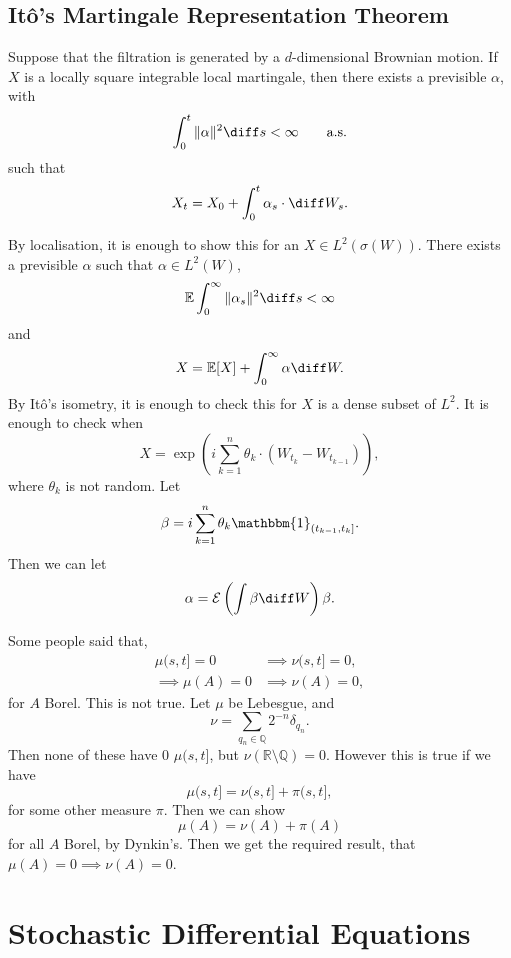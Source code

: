 \documentclass[12pt]{article}
\begin{document}
\subsection{It\^o's Martingale Representation Theorem}%
\label{sub:mrt}

Suppose that the filtration is generated by a $d$-dimensional Brownian motion. If $X$ is a locally square integrable local martingale, then there exists a previsible $\alpha$, with
\[
	\int_0^{t} \|\alpha\|^2 \diff s < \infty \qquad\text{a.s.}
\]
such that
\[
X_t = X_0 + \int_0^{t} \alpha_s \cdot \diff W_s.
\]

\begin{proofbox}
	By localisation, it is enough to show this for an $X \in L^2(\sigma(W))$. There exists a previsible $\alpha$ such that $\alpha \in L^2(W)$,
	\[
	\mathbb{E} \int_0^{\infty} \|\alpha_s\|^2 \diff s< \infty
	\]
	and
	\[
	X = \mathbb{E}[X] + \int_0^{\infty} \alpha \diff W.
	\]
	By It\^o's isometry, it is enough to check this for $X$ is a dense subset of $L^2$. It is enough to check when
	\[
	X = \exp \left( i \sum_{k = 1}^{n} \theta_{k} \cdot (W_{t_k} - W_{t_{k-1}}) \right),
	\]
	where $\theta_k$ is not random. Let
	\[
		\beta = i \sum_{k = 1}^{n} \theta_k \mathbbm{1}_{(t_{k-1}, t_k]}.
	\]
	Then we can let
	\[
	\alpha = \mathcal{E} \left( \int \beta \diff W \right) \beta.
	\]
\end{proofbox}


\begin{exbox}
	Some people said that,
	\begin{align*}
		\mu(s, t] = 0& \implies \nu(s, t] = 0, \\
		\implies \mu(A) = 0 &\implies \nu(A) = 0,
	\end{align*}
	for $A$ Borel. This is not true. Let $\mu$ be Lebesgue, and
	\[
	\nu = \sum_{q_n \in \mathbb{Q}} 2^{-n} \delta_{q_n}.
	\]
	Then none of these have 0 $\mu(s, t]$, but $\nu(\mathbb{R} \setminus \mathbb{Q}) = 0$. However this is true if we have
	\[
		\mu(s, t] = \nu(s, t] + \pi(s, t],
	\]
	for some other measure $\pi$. Then we can show
	\[
	\mu(A) = \nu(A) + \pi(A)
	\]
	for all $A$ Borel, by Dynkin's. Then we get the required result, that $\mu(A) = 0 \implies \nu(A) = 0$.
\end{exbox}

\newpage

\section{Stochastic Differential Equations}%
\label{sec:sde}
\end{document}
